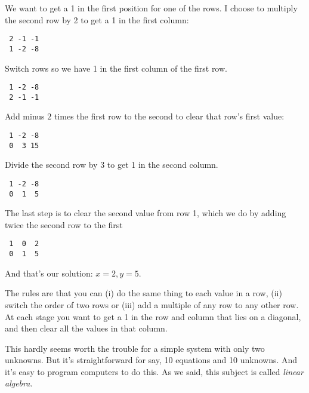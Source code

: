 \documentclass[11pt, oneside]{article}
\begin{document}
We want to get a 1 in the first position for one of the rows.  I choose to multiply the second row by 2 to get a 1 in the first column:
\begin{verbatim}
 2 -1 -1
 1 -2 -8
\end{verbatim}
Switch rows so we have 1 in the first column of the first row.
\begin{verbatim}
 1 -2 -8
 2 -1 -1
\end{verbatim}
Add minus $2$ times the first row to the second to clear that row's first value:
\begin{verbatim}
 1 -2 -8
 0  3 15
\end{verbatim}
Divide the second row by $3$ to get 1 in the second column.
\begin{verbatim}
 1 -2 -8
 0  1  5
\end{verbatim}
The last step is to clear the second value from row 1, which we do by adding twice the second row to the first
\begin{verbatim}
 1  0  2
 0  1  5
\end{verbatim}
And that's our solution:  $x = 2, y = 5$.

The rules are that you can (i) do the same thing to each value in a row, (ii) switch the order of two rows or (iii) add a multiple of any row to any other row.  At each stage you want to get a 1 in the row and column that lies on a diagonal, and then clear all the values in that column.

This hardly seems worth the trouble for a simple system with only two unknowns.  But it's straightforward for say, 10 equations and 10 unknowns.  And it's easy to program computers to do this.  As we said, this subject is called \emph{linear algebra}.
\end{document}
